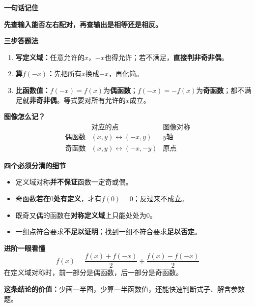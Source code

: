 \clearpage
\begin{summarybox}
\textbf{一句话记住}

\textbf{先查输入能否左右配对，再查输出是相等还是相反。}

\medskip
\textbf{三步答题法}
\begin{enumerate}[leftmargin=*,itemsep=0.25em]
\item \textbf{写定义域：}任意允许的$x$，$-x$也得允许；若不满足，\textbf{直接判非奇非偶}。
\item \textbf{算$f(-x)$：}先把所有$x$换成$-x$，再化简。
\item \textbf{比函数值：}$f(-x)=f(x)$为\textbf{偶函数}；$f(-x)=-f(x)$为\textbf{奇函数}；都不满足就\textbf{非奇非偶}。等式要对所有允许的$x$成立。
\end{enumerate}

\medskip
\textbf{图像怎么记？}
\[
\begin{array}{c|c|c}
&\text{对应的点}&\text{图像对称}\\
\hline
\text{偶函数}&(x,y)\leftrightarrow(-x,y)&y\text{轴}\\
\text{奇函数}&(x,y)\leftrightarrow(-x,-y)&\text{原点}
\end{array}
\]

\medskip
\textbf{四个必须分清的细节}
\begin{itemize}[leftmargin=*,itemsep=0.25em]
\item 定义域对称\textbf{并不保证}函数一定奇或偶。
\item 奇函数\textbf{若在$0$处有定义}，才有$f(0)=0$；反过来不成立。
\item 既奇又偶的函数在\textbf{对称定义域}上只能处处为$0$。
\item 一组点符合要求\textbf{不足以证明}；找到一组不符合要求\textbf{足以否定}。
\end{itemize}

\medskip
\textbf{进阶一眼看懂}
\[
\boxed{f(x)=\frac{f(x)+f(-x)}2+\frac{f(x)-f(-x)}2}
\]
在定义域对称时，前一部分是偶函数，后一部分是奇函数。

\medskip
\textbf{这条结论的价值：}少画一半图，少算一半函数值，还能快速判断式子、解含参数题。
\end{summarybox}
